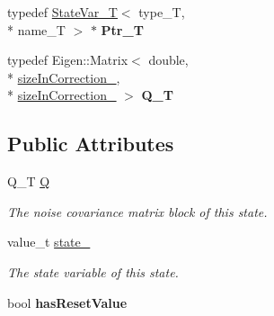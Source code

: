 \begin{DoxyCompactItemize}
\item 
\hypertarget{structmsf__core_1_1StateVar__T_a735b254ba24acec4b93ec43253862ab9}{typedef \hyperlink{structmsf__core_1_1StateVar__T}{State\-Var\-\_\-\-T}$<$ type\-\_\-\-T, \\*
name\-\_\-\-T $>$ $\ast$ {\bfseries Ptr\-\_\-\-T}}\label{structmsf__core_1_1StateVar__T_a735b254ba24acec4b93ec43253862ab9}

\item 
\hypertarget{structmsf__core_1_1StateVar__T_a1f30ac85f0fd4307e50fd16377976626}{typedef Eigen\-::\-Matrix$<$ double, \\*
\hyperlink{structmsf__core_1_1StateVar__T_a4c4dbb9fb688dffcb86c1a2f5ea7ac3eaafba5fac8b93bd4155c03a70a6d6c9b4}{size\-In\-Correction\-\_\-}, \\*
\hyperlink{structmsf__core_1_1StateVar__T_a4c4dbb9fb688dffcb86c1a2f5ea7ac3eaafba5fac8b93bd4155c03a70a6d6c9b4}{size\-In\-Correction\-\_\-} $>$ {\bfseries Q\-\_\-\-T}}\label{structmsf__core_1_1StateVar__T_a1f30ac85f0fd4307e50fd16377976626}

\end{DoxyCompactItemize}
\subsection*{Public Attributes}
\begin{DoxyCompactItemize}
\item 
\hypertarget{structmsf__core_1_1StateVar__T_a618788b64b890837225f9c71c2b81d5d}{Q\-\_\-\-T \hyperlink{structmsf__core_1_1StateVar__T_a618788b64b890837225f9c71c2b81d5d}{Q}}\label{structmsf__core_1_1StateVar__T_a618788b64b890837225f9c71c2b81d5d}

\begin{DoxyCompactList}\small\item\em The noise covariance matrix block of this state. \end{DoxyCompactList}\item 
\hypertarget{structmsf__core_1_1StateVar__T_abb101cd9e3e72fad81bad441947579fa}{value\-\_\-t \hyperlink{structmsf__core_1_1StateVar__T_abb101cd9e3e72fad81bad441947579fa}{state\-\_\-}}\label{structmsf__core_1_1StateVar__T_abb101cd9e3e72fad81bad441947579fa}

\begin{DoxyCompactList}\small\item\em The state variable of this state. \end{DoxyCompactList}\item 
\hypertarget{structmsf__core_1_1StateVar__T_a60502bb0e8813b19e52dac9dd2a41ab6}{bool {\bfseries has\-Reset\-Value}}\label{structmsf__core_1_1StateVar__T_a60502bb0e8813b19e52dac9dd2a41ab6}

\end{DoxyCompactItemize}


